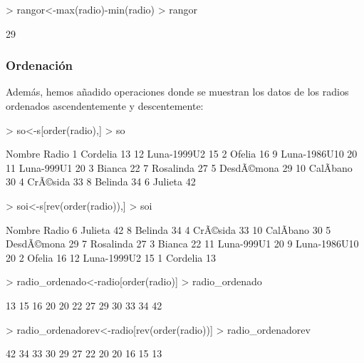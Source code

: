 \documentclass [a4paper] {article}
\begin{document}
\begin{Schunk}
\begin{Sinput}
> rangor<-max(radio)-min(radio)
> rangor
\end{Sinput}
\begin{Soutput}
[1] 29
\end{Soutput}
\end{Schunk}

\subsubsection{Ordenación}
Además, hemos añadido operaciones donde se muestran los datos de los radios ordenados ascendentemente y
descentemente:

\begin{Schunk}
\begin{Sinput}
> so<-s[order(radio),]
> so
\end{Sinput}
\begin{Soutput}
         Nombre Radio
1      Cordelia    13
12  Luna-1999U2    15
2        Ofelia    16
9  Luna-1986U10    20
11   Luna-999U1    20
3        Bianca    22
7     Rosalinda    27
5    DesdÃ©mona    29
10    CalÃ­bano    30
4      CrÃ©sida    33
8       Belinda    34
6       Julieta    42
\end{Soutput}
\begin{Sinput}
> soi<-s[rev(order(radio)),]
> soi
\end{Sinput}
\begin{Soutput}
         Nombre Radio
6       Julieta    42
8       Belinda    34
4      CrÃ©sida    33
10    CalÃ­bano    30
5    DesdÃ©mona    29
7     Rosalinda    27
3        Bianca    22
11   Luna-999U1    20
9  Luna-1986U10    20
2        Ofelia    16
12  Luna-1999U2    15
1      Cordelia    13
\end{Soutput}
\begin{Sinput}
> radio_ordenado<-radio[order(radio)]
> radio_ordenado
\end{Sinput}
\begin{Soutput}
 [1] 13 15 16 20 20 22 27 29 30 33 34 42
\end{Soutput}
\begin{Sinput}
> radio_ordenadorev<-radio[rev(order(radio))]
> radio_ordenadorev
\end{Sinput}
\begin{Soutput}
 [1] 42 34 33 30 29 27 22 20 20 16 15 13
\end{Soutput}
\end{Schunk}
\end{document}
